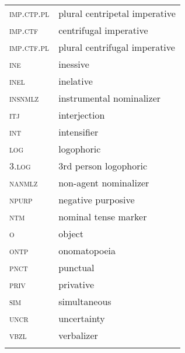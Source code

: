 \documentclass[output=paper,
modfonts,nonflat
]{langsci/langscibook}
\begin{document}
\begin{tabularx}{.45\textwidth}{lQ}
\textsc{imp.ctp.pl } & plural centripetal imperative \\
\textsc{imp.ctf } & centrifugal imperative \\
\textsc{imp.ctf.pl } & plural centrifugal imperative \\ 
\textsc{ine } & inessive \\
\textsc{inel } & inelative \\
\textsc{insnmlz } & instrumental nominalizer \\
\textsc{itj } & interjection \\
\textsc{int } & intensifier \\
\textsc{log } & logophoric \\
\textsc{3.log } & 3rd person logophoric \\
\textsc{nanmlz } & non-agent nominalizer \\
\textsc{npurp } & negative purposive \\
\textsc{ntm } & nominal tense marker \\
\textsc{o } & object \\
\textsc{ontp } & onomatopoeia \\
\textsc{pnct } & punctual \\
\textsc{priv } & privative \\
\textsc{sim } & simultaneous \\
\textsc{uncr } & uncertainty \\
\textsc{vbzl } & verbalizer \\ 
\\
\end{tabularx}


 
% 
{\sloppy
\printbibliography[heading=subbibliography,notkeyword=this]
}
\end{document}
